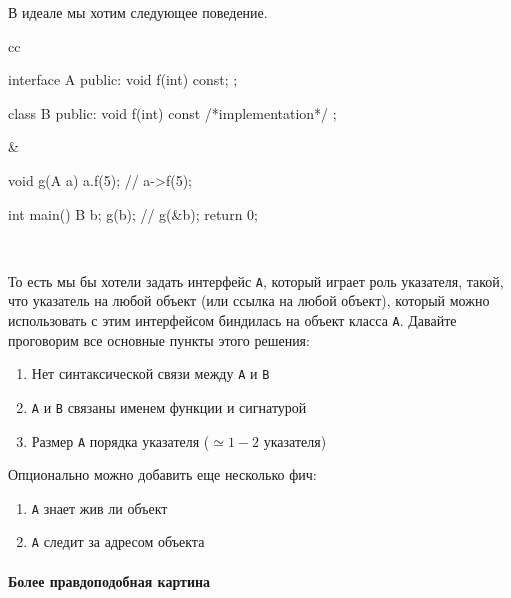 В идеале мы хотим следующее поведение.
\begin{center}
\begin{tabular}{cc}
{
\begin{minipage}[\baselineskip]{9cm}
\begin{cppcode}[numbers = none]
interface A {
public:
  void f(int) const;
};

class B {
public:
   void f(int) const { /*implementation*/ }
};
\end{cppcode}
\end{minipage}
}&{
\begin{minipage}[\baselineskip]{5cm}
\begin{cppcode}[numbers = none]
void g(A a) {
  a.f(5); // a->f(5);
}

int main() {
  B b;
  g(b); // g(&b);
  return 0;
}
\end{cppcode}
\end{minipage}
}\\
\end{tabular}
\end{center}
То есть мы бы хотели задать интерфейс \texttt{A}, который играет роль указателя, такой, что указатель на любой объект (или ссылка на любой объект), который можно использовать с этим интерфейсом биндилась на объект класса \texttt{A}.
Давайте проговорим все основные пункты этого решения:
\begin{enumerate}
\item Нет синтаксической связи между \texttt{A} и \texttt{B}

\item \texttt{A} и \texttt{B} связаны именем функции и сигнатурой

\item Размер \texttt{A} порядка указателя ($\simeq 1-2$ указателя)
\end{enumerate}
Опционально можно добавить еще несколько фич:
\begin{enumerate}
\item \texttt{A} знает жив ли объект

\item \texttt{A} следит за адресом объекта
\end{enumerate}

\paragraph{Более правдоподобная картина}

